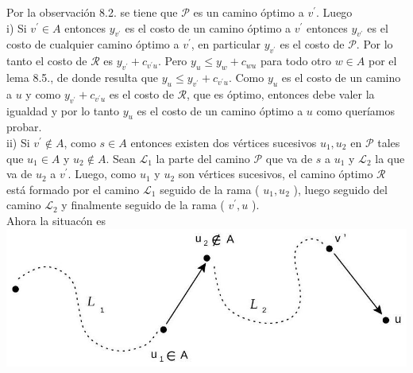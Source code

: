 \documentclass[10pt]{article}
\begin{document}
Por la observación 8.2. se tiene que $\mathcal{P}$ es un camino óptimo a $v^{\prime}$. Luego\\
i) Si $v^{\prime} \in A$ entonces $y_{v^{\prime}}$ es el costo de un camino óptimo a $v^{\prime}$ entonces $y_{v^{\prime}}$ es el costo de cualquier camino óptimo a $v^{\prime}$, en particular $y_{v^{\prime}}$ es el costo de $\mathcal{P}$. Por lo tanto el costo de $\mathcal{R}$ es $y_{v^{\prime}}+c_{v^{\prime} u}$. Pero $y_{u} \leq y_{w}+c_{w u}$ para todo otro $w \in A$ por el lema 8.5., de donde resulta que $y_{u} \leq y_{v^{\prime}}+c_{v^{\prime} u}$. Como $y_{u}$ es el costo de un camino a $u$ y como $y_{v^{\prime}}+c_{v^{\prime} u}$ es el costo de $\mathcal{R}$, que es óptimo, entonces debe valer la igualdad y por lo tanto $y_{u}$ es el costo de un camino óptimo a $u$ como queríamos probar.\\
ii) Si $v^{\prime} \notin A$, como $s \in A$ entonces existen dos vértices sucesivos $u_{1}, u_{2}$ en $\mathcal{P}$ tales que $u_{1} \in A$ y $u_{2} \notin A$. Sean $\mathcal{L}_{1}$ la parte del camino $\mathcal{P}$ que va de $s$ a $u_{1}$ y $\mathcal{L}_{2}$ la que va de $u_{2}$ a $v^{\prime}$. Luego, como $u_{1}$ y $u_{2}$ son vértices sucesivos, el camino óptimo $\mathcal{R}$ está formado por el camino $\mathcal{L}_{1}$ seguido de la rama ( $u_{1}, u_{2}$ ), luego seguido del camino $\mathcal{L}_{2}$ y finalmente seguido de la rama ( $v^{\prime}, u$ ).\\
Ahora la situacón es\\
\includegraphics[max width=\textwidth, center]{2025_09_05_93c7c1835f249f70c0eeg-32(1)}
\end{document}
